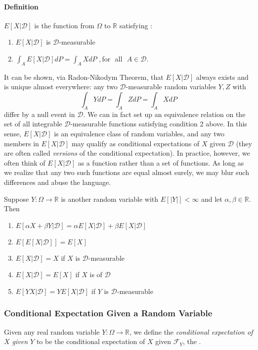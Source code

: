 \documentclass[12pt]{article}
\begin{document}
\paragraph{Definition} $E[X|\mathcal{D}]$ is the function from $\Omega$ to $\mathbb{R}$
satisfying $\colon$
\begin{enumerate}
\item $E[X|\mathcal{D}]$ is $\mathcal{D}$-measurable
\item $\displaystyle \int_{A}E[X|\mathcal{D}]dP=\int_{A}XdP$ ,\,for\,\ all\,\ $A\in \mathcal{D}$.
\end{enumerate}
It can be shown, via Radon-Nikodym Theorem, that $E[X|\mathcal{D}]$ always exists and is unique almost everywhere: any two $\mathcal{D}$-measurable random variables $Y,Z$ with $$\displaystyle \int_{A} YdP = \int_{A} ZdP = \int_{A} XdP $$ differ by a null event in $\mathcal{D}$.  We can in fact set up an equivalence relation on the set of all integrable $\mathcal{D}$-measurable functions satisfying condition 2 above.  In this sense, $E[X|\mathcal{D}]$ is an equivalence class of random variables, and any two members in $E[X|\mathcal{D}]$ may qualify as conditional expectations of $X$ given $\mathcal{D}$ (they are often called \emph{versions} of the conditional expectation).  In practice, however, we often think of $E[X|\mathcal{D}]$ as a function rather than a set of functions.  As long as we realize that any two such functions are equal almost surely, we may blur such differences and abuse the language.

Suppose $Y\colon \Omega \to \mathbb{R}$ is another random variable with $E[|Y|]<\infty $
and let $\alpha,\beta \in \mathbb{R}$. Then
\begin{enumerate} 
\item $E[\alpha X+\beta Y|\mathcal{D}]=\alpha E[X|\mathcal{D}]+\beta E[X|\mathcal{D}]$
\item $E[E[X|\mathcal{D}]]=E[X]$
\item $E[X|\mathcal{D}]=X$ if $X$ is $\mathcal{D}$-measurable
\item $E[X|\mathcal{D}]=E[X]$ if $X$ is  of $\mathcal{D}$
\item $E[YX|\mathcal{D}]=YE[X|\mathcal{D}]$ if $Y$ is $\mathcal{D}$-measurable
\end{enumerate}

\subsubsection*{Conditional Expectation Given a Random Variable}
Given any real random variable $Y:\Omega \to \mathbb{R}$, we define the \emph{conditional expectation of $X$ given $Y$} to be the conditional expectation of $X$ given $\mathcal{F}_Y$, the .
\end{document}
